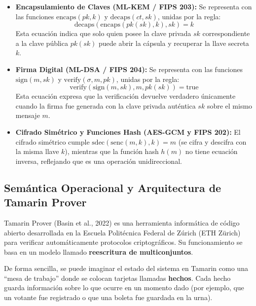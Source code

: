 \begin{itemize}
	\item \textbf{Encapsulamiento de Claves (ML-KEM / FIPS 203):} Se representa con las funciones $\text{encaps}(pk, k)$ y $\text{decaps}(ct, sk)$, unidas por la regla:
	\begin{equation}
		\text{decaps}(\text{encaps}(pk(sk), k), sk) = k
	\end{equation}
	Esta ecuación indica que solo quien posee la clave privada $sk$ correspondiente a la clave pública $pk(sk)$ puede abrir la cápsula y recuperar la llave secreta $k$.

	\item \textbf{Firma Digital (ML-DSA / FIPS 204):} Se representa con las funciones $\text{sign}(m, sk)$ y $\text{verify}(\sigma, m, pk)$, unidas por la regla:
	\begin{equation}
		\text{verify}(\text{sign}(m, sk), m, pk(sk)) = \text{true}
	\end{equation}
	Esta ecuación expresa que la verificación devuelve verdadero únicamente cuando la firma fue generada con la clave privada auténtica $sk$ sobre el mismo mensaje $m$.

	\item \textbf{Cifrado Simétrico y Funciones Hash (AES-GCM y FIPS 202):} El cifrado simétrico cumple $\text{sdec}(\text{senc}(m, k), k) = m$ (se cifra y descifra con la misma llave $k$), mientras que la función hash $h(m)$ no tiene ecuación inversa, reflejando que es una operación unidireccional.
\end{itemize}

\subsection{Semántica Operacional y Arquitectura de Tamarin Prover}

Tamarin Prover (Basin et al., 2022) es una herramienta informática de código abierto desarrollada en la Escuela Politécnica Federal de Zúrich (ETH Zürich) para verificar automáticamente protocolos criptográficos. Su funcionamiento se basa en un modelo llamado \textbf{reescritura de multiconjuntos}.

De forma sencilla, se puede imaginar el estado del sistema en Tamarin como una ``mesa de trabajo'' donde se colocan tarjetas llamadas \textbf{hechos}. Cada hecho guarda información sobre lo que ocurre en un momento dado (por ejemplo, que un votante fue registrado o que una boleta fue guardada en la urna).

